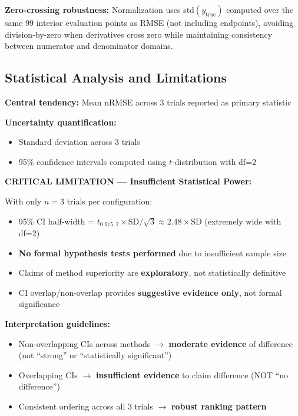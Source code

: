 \textbf{Zero-crossing robustness:} Normalization uses std$(y_{\text{true}})$ computed over the same 99 interior evaluation points as RMSE (not including endpoints), avoiding division-by-zero when derivatives cross zero while maintaining consistency between numerator and denominator domains.

\subsection{Statistical Analysis and Limitations}
\label{sec:statistics}

\textbf{Central tendency:} Mean nRMSE across 3 trials reported as primary statistic

\textbf{Uncertainty quantification:}
\begin{itemize}
    \item Standard deviation across 3 trials
    \item 95\% confidence intervals computed using $t$-distribution with df=2
\end{itemize}

\textbf{CRITICAL LIMITATION --- Insufficient Statistical Power:}

With only $n=3$ trials per configuration:
\begin{itemize}
    \item 95\% CI half-width = $t_{0.975,2} \times \text{SD} / \sqrt{3} \approx 2.48 \times \text{SD}$ (extremely wide with df=2)
    \item \textbf{No formal hypothesis tests performed} due to insufficient sample size
    \item Claims of method superiority are \textbf{exploratory}, not statistically definitive
    \item CI overlap/non-overlap provides \textbf{suggestive evidence only}, not formal significance
\end{itemize}

\textbf{Interpretation guidelines:}
\begin{itemize}
    \item Non-overlapping CIs across methods $\rightarrow$ \textbf{moderate evidence} of difference (not ``strong'' or ``statistically significant'')
    \item Overlapping CIs $\rightarrow$ \textbf{insufficient evidence} to claim difference (NOT ``no difference'')
    \item Consistent ordering across all 3 trials $\rightarrow$ \textbf{robust ranking pattern}
\end{itemize}

